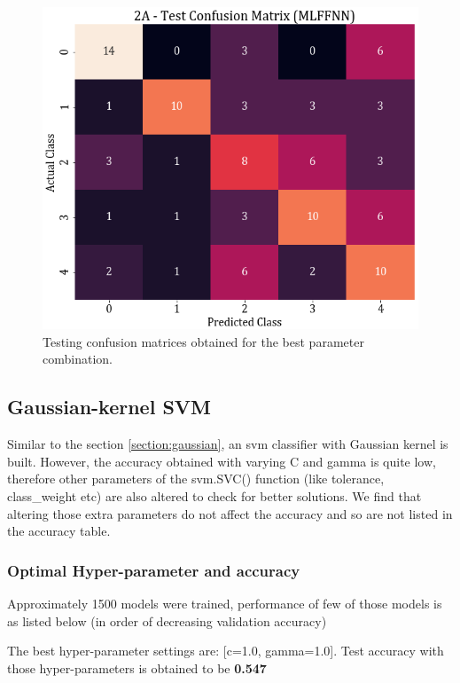 \documentclass[11pt,a4paper]{article}
\begin{document}
\begin{figure}[H]
    \centering
    \includegraphics[scale=0.45]{images/2A_MLFFNN_test_confmat.png}
    \caption{Testing confusion matrices obtained for the best parameter combination.}
\end{figure}


\subsection{Gaussian-kernel SVM}

Similar to the section \ref{section:gaussian}, an svm classifier with Gaussian kernel is built. However, the accuracy obtained with varying C and gamma is quite low, therefore other parameters of the svm.SVC()  function (like tolerance, class\_weight etc) are also altered to check for better solutions. We find that altering those extra parameters do not affect the accuracy and so are not listed in the accuracy table.

\subsubsection{Optimal Hyper-parameter and accuracy}

Approximately 1500 models were trained, performance of few of those models is as listed below (in order of decreasing validation accuracy)



The best hyper-parameter settings are: [c=1.0, gamma=1.0]. Test accuracy with those hyper-parameters is obtained to be \textbf{0.547}
\end{document}
